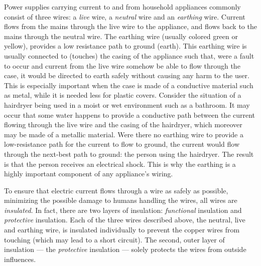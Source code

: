



\thispagestyle{plain}




Power supplies carrying current to and from household appliances commonly consist of three wires: a \emph{live} wire, a \emph{neutral} wire and an \emph{earthing} wire. Current flows from the mains through the live wire to the appliance, and flows back to the mains through the neutral wire. The earthing wire (usually colored green or yellow), provides a low resistance path to ground (earth). This earthing wire is usually connected to (touches) the casing of the appliance such that, were a fault to occur and current from the live wire somehow be able to flow through the case, it would be directed to earth safely without causing any harm to the user. This is especially important when the case is made of a conductive material such as metal, while it is needed less for plastic covers. Consider the situation of a hairdryer being used in a moist or wet environment such as a bathroom. It may occur that some water happens to provide a conductive path between the current flowing through the live wire and the casing of the hairdryer, which moreover may be made of a metallic material. Were there no earthing wire to provide a low-resistance path for the current to flow to ground, the current would flow through the next-best path to ground: the person using the hairdryer. The result is that the person receives an electrical shock. This is why the earthing is a highly important component of any appliance's wiring. 

To ensure that electric current flows through a wire as safely as possible, minimizing the possible damage to humans handling the wires, all wires are \emph{insulated}. In fact, there are two layers of insulation: \emph{functional} insulation and \emph{protective} insulation. Each of the three wires described above, the neutral, live and earthing wire, is insulated individually to prevent the copper wires from touching (which may lead to a short circuit). The second, outer layer of insulation --- the \emph{protective} insulation --- solely protects the wires from outside influences. 

